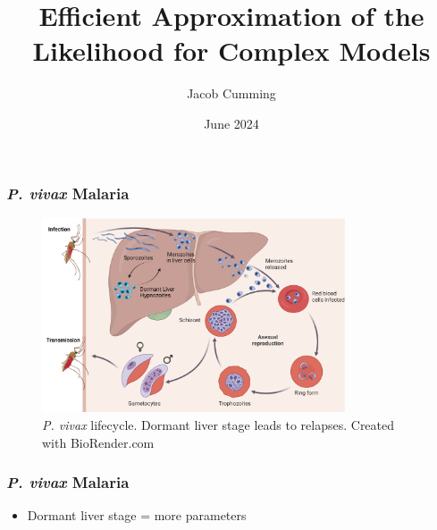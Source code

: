 \documentclass{beamer}
\title{Efficient Approximation of the Likelihood for Complex Models}
\author{Jacob Cumming}
\institute{University of Melbourne, Walter and Eliza Hall Institute}
\date{June 2024}
\begin{document}
\frame{\titlepage}


\begin{frame}
    \frametitle{\emph{P. vivax} Malaria}
    \begin{figure}
        \centering
        \includegraphics[width=0.8\textwidth]{vivax_lifecycle_full.pdf}
        \caption{\emph{P. vivax} lifecycle. Dormant liver stage leads to
            relapses. Created with BioRender.com}
    \end{figure}
\end{frame}


\begin{frame}
    \frametitle{\emph{P. vivax} Malaria}
    \begin{itemize}
        \item Dormant liver stage = more parameters
    \end{itemize}
\end{frame}
\end{document}
